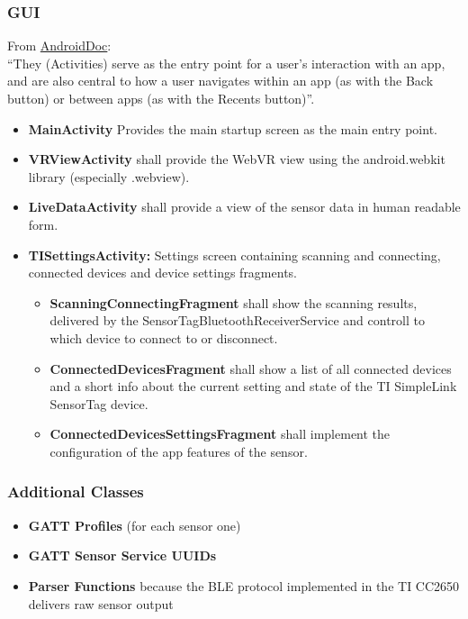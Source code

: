\subsubsection{GUI}
From \href{https://developer.android.com/guide/components/services.html}{AndroidDoc}: \\
``They (Activities) serve as the entry point for a user's interaction with an app, and are also central to how a user navigates within an app (as with the Back button) or between apps (as with the Recents button)''. \newline
\begin{itemize}
  \item \textbf{MainActivity} Provides the main startup screen as the main entry point.
  \item \textbf{VRViewActivity} shall provide the WebVR view using the android.webkit library (especially .webview).
  \item \textbf{LiveDataActivity} shall provide a view of the sensor data in human readable form.
  \item \textbf{TISettingsActivity:} Settings screen containing scanning and connecting, connected devices and device settings fragments.
  \begin{itemize}
    \item \textbf{ScanningConnectingFragment} shall show the scanning results, delivered by the SensorTagBluetoothReceiverService and controll to which device to connect to or disconnect.
    \item \textbf{ConnectedDevicesFragment} shall show a list of all connected devices and a short info about the current setting and state of the TI SimpleLink SensorTag device.
    \item \textbf{ConnectedDevicesSettingsFragment} shall implement the configuration of the app features of the sensor.
  \end{itemize}
\end{itemize}

\subsubsection{Additional Classes}
\begin{itemize}
  \item \textbf{GATT Profiles} (for each sensor one)
  \item \textbf{GATT Sensor Service UUIDs}
  \item \textbf{Parser Functions} because the BLE protocol implemented in the TI CC2650 delivers raw sensor output
\end{itemize}
